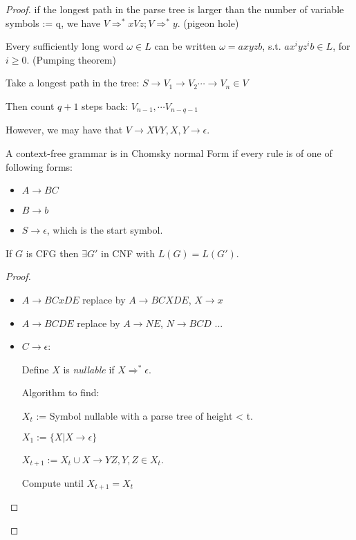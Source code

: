\begin{proof}

  if the longest path in the parse tree is larger than the number of
  variable symbols := q, we have
  \(V \Rightarrow^* xVz; V\Rightarrow^* y\). (pigeon hole)

  Every sufficiently long word \(\omega \in L\) can be written
  \(\omega = axyzb\), s.t. \(ax^iyz^ib \in L\), for \(i \ge 0\).
  (Pumping theorem)

  Take a longest path in the tree:
  \(S \rightarrow V_1 \rightarrow V_2 \cdots \rightarrow V_n \in V\)

  Then count \(q+1\) steps back: \(V_{n-1}, \cdots V_{n-q-1}\)

  However, we may have that
  \(V \rightarrow XVY, X,Y \rightarrow \epsilon\).

  A context-free grammar is in Chomsky normal Form if every rule is of
  one of following forms:

  \begin{itemize}
  \item
    \(A \rightarrow BC\)
  \item
    \(B \rightarrow b\)
  \item
    \(S \rightarrow \epsilon\), which is the start symbol.
  \end{itemize}
\begin{theorem}
If \(G\) is CFG then \(\exists G'\) in CNF with
  \(L(G) = L(G')\).
\end{theorem}

\begin{proof}
  \begin{itemize}
  \item
    \(A \rightarrow BCxDE\) replace by \(A \rightarrow BCXDE\),
    \(X \rightarrow x\)
  \item
    \(A \rightarrow BCDE\) replace by \(A \rightarrow NE\),
    \(N \rightarrow BCD\) ...
  \item
    \(C \rightarrow \epsilon\):

    Define $X$ is \emph{nullable} if \(X \Rightarrow^* \epsilon\).

    Algorithm to find:

    \(X_t\) := Symbol nullable with a parse tree of height \textless{}
    t.

    \(X_1 := \{ X | X \rightarrow \epsilon \}\)

    \(X_{t+1} := X_t \cup X \rightarrow YZ, Y,Z \in X_t\).

    Compute until \(X_{t+1} = X_t\)
  \end{itemize}


\end{proof}
\end{proof}
